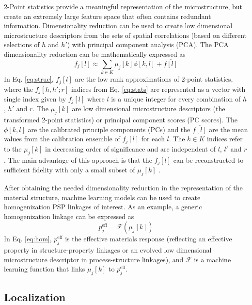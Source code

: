 \documentclass{bmcart}
\begin{document}
2-Point statistics provide a meaningful representation of the
microstructure, but create an extremely large feature space that often
contains redundant information. Dimensionality reduction can be used
to create low dimensional microstructure descriptors from the sets of
spatial correlations (based on different selections of $h$ and $h'$)
with principal component analysis (PCA). The PCA dimensionality
reduction can be mathematically expressed as
\begin{equation} \label{eq:struc}
    f_j\left[l\right] \approx \sum_{k\in K} \mu_j\left[k\right]
    \phi\left[k,l\right] + \overline{f[l]}
\end{equation}
In Eq. \ref{eq:struc}, $f_j\left[l\right]$ are the low rank
approximations of 2-point statistics, where the
$f_j\left[h, h'; r\right]$ indices from Eq. \ref{eq:stats}
are represented as a vector with single index given by
$f_j\left[l\right]$ where $l$ is a unique integer for every combination
of $h$, $h'$ and $r$. The $\mu_j[k]$ are low dimensional microstructure
descriptors (the transformed 2-point statistics) or principal component
scores (PC scores). The $\phi\left[k, l\right]$ are the calibrated
principle components (PCs) and the $\overline{f[l]}$ are the mean
values  from the calibration ensemble of $f_j\left[l\right]$ for each
$l$. The $k \in K$ indices refer to the $\mu_j\left[k\right]$ in
decreasing order of significance and are independent of $l$, $l'$ and
$r$. The main advantage of this approach is that the
$f_j\left[l\right]$ can be reconstructed to sufficient fidelity with
only a small subset of $\mu_j\left[k\right]$
\cite{hotelling1933analysis}.

After obtaining the needed dimensionality reduction in the
representation of the material structure, machine learning models can
be used to create homogenization PSP linkages of interest.
As an example, a generic homogenization linkage can be expressed as
\begin{equation} \label{eq:hom}
    p_j^{\text{eff}} = \mathcal{F}(\mu_j[k])
\end{equation}
In Eq. \ref{eq:hom}, $p_j^{\text{eff}}$ is the effective materials
response (reflecting an effective property in structure-property
linkages or an evolved low dimensional microstructure descriptor in
process-structure linkages), and $\mathcal{F}$ is a machine learning
function that links $\mu_j[k]$ to $p_j^{\text{eff}}$.

\subsection{Localization}
\end{document}

